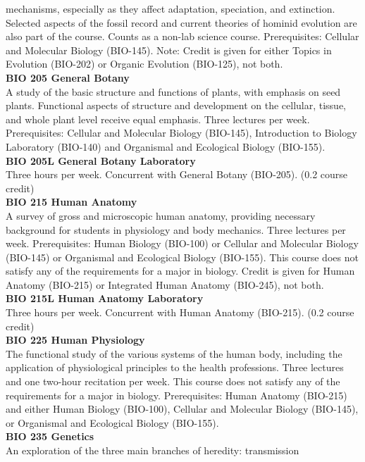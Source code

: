 \documentclass[
  letterpaper,
]{scrbook}
\begin{document}
mechanisms, especially as they affect adaptation, speciation, and
extinction. Selected aspects of the fossil record and current theories
of hominid evolution are also part of the course. Counts as a non-lab
science course. Prerequisites: Cellular and Molecular Biology (BIO-145).
Note: Credit is given for either Topics in Evolution (BIO-202) or
Organic Evolution (BIO-125), not both.\\
\textbf{BIO 205 General Botany}\\
A study of the basic structure and functions of plants, with emphasis on
seed plants. Functional aspects of structure and development on the
cellular, tissue, and whole plant level receive equal emphasis. Three
lectures per week. Prerequisites: Cellular and Molecular Biology
(BIO-145), Introduction to Biology Laboratory (BIO-140) and Organismal
and Ecological Biology (BIO-155).\\
\textbf{BIO 205L General Botany Laboratory}\\
Three hours per week. Concurrent with General Botany (BIO-205). (0.2
course credit)\\
\textbf{BIO 215 Human Anatomy}\\
A survey of gross and microscopic human anatomy, providing necessary
background for students in physiology and body mechanics. Three lectures
per week. Prerequisites: Human Biology (BIO-100) or Cellular and
Molecular Biology (BIO-145) or Organismal and Ecological Biology
(BIO-155). This course does not satisfy any of the requirements for a
major in biology. Credit is given for Human Anatomy (BIO-215) or
Integrated Human Anatomy (BIO-245), not both.\\
\textbf{BIO 215L Human Anatomy Laboratory}\\
Three hours per week. Concurrent with Human Anatomy (BIO-215). (0.2
course credit)\\
\textbf{BIO 225 Human Physiology}\\
The functional study of the various systems of the human body, including
the application of physiological principles to the health professions.
Three lectures and one two-hour recitation per week. This course does
not satisfy any of the requirements for a major in biology.
Prerequisites: Human Anatomy (BIO-215) and either Human Biology
(BIO-100), Cellular and Molecular Biology (BIO-145), or Organismal and
Ecological Biology (BIO-155).\\
\textbf{BIO 235 Genetics}\\
An exploration of the three main branches of heredity: transmission
\end{document}
